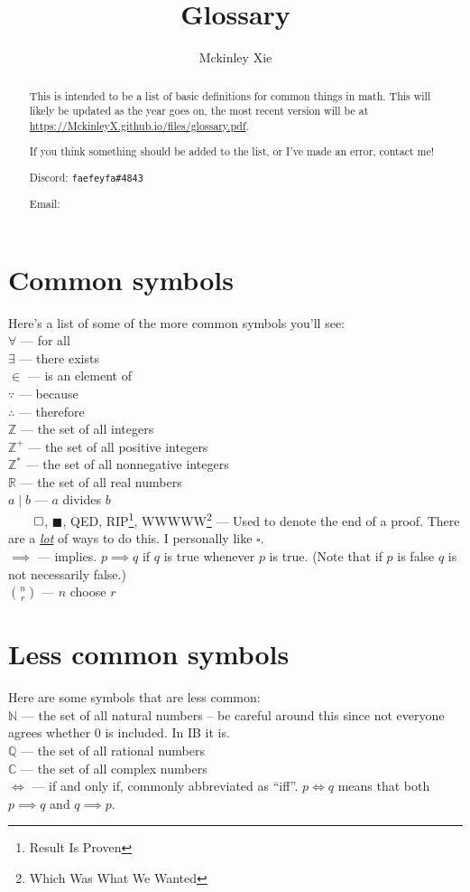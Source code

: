 \documentclass[a4paper]{scrartcl}
\title{Glossary}
\author{Mckinley Xie}
\newcommand{\term}[2]{\\$#1$  ---  #2}
\begin{document}
\maketitle
\begin{abstract}
	This is intended to be a list of basic definitions for common things in math. This will likely be updated as the year goes on, the most recent version will be at \url{https://MckinleyX.github.io/files/glossary.pdf}.

	If you think something should be added to the list, or I've made an error, contact me!

	Discord: \texttt{faefeyfa\#4843}

	Email: 
\end{abstract}
\section{Common symbols}
Here's a list of some of the more common symbols you'll see:
	\term{\forall}{for all} 
	\term{\exists}{there exists} 
	\term{\in}{is an element of}
	\term{\because}{because}
	\term{\therefore}{therefore}
	\term{\mathbb{Z}}{the set of all integers}
	\term{\mathbb{Z}^+}{the set of all positive integers}
	\term{\mathbb{Z}^*}{the set of all nonnegative integers}
	\term{\mathbb{R}}{the set of all real numbers}
	\term{a \mid b}{$a$ divides $b$}
	\\$\qed$, $\blacksquare$, QED, RIP\footnote{Result Is Proven}, WWWWW\footnote{Which Was What We Wanted} --- Used to denote the end of a proof. There are a \href{https://mathwithbaddrawings.com/2019/10/02/how-to-end-a-proof/}{\emph{lot}} of ways to do this. I personally like $\square$.
	\term{\implies}{implies. $p \implies q$ if $q$ is true whenever $p$ is true. (Note that if $p$ is false $q$ is not necessarily false.)}
	\term{\binom{n}{r}}{$n$ choose $r$}
\section{Less common symbols}
Here are some symbols that are less common:
	\term{\mathbb{N}}{the set of all natural numbers -- be careful around this since not everyone agrees whether 0 is included. In IB it is.}
	\term{\mathbb{Q}}{the set of all rational numbers}
	\term{\mathbb{C}}{the set of all complex numbers}
	\term{\iff}{if and only if, commonly abbreviated as ``iff''. $p \iff q$ means that both $p \implies q$ and $q \implies p$.}
\end{document}
